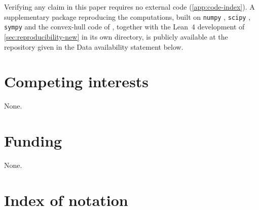 \documentclass[11pt,reqno]{amsart}
\newcommand{\bluelink}[2]{\href{#1}{\textcolor{blue}{#2}}}
\renewcommand{\_}{\origunderscore\allowbreak}
\numberwithin{equation}{section}
\theoremstyle{plain}
\theoremstyle{definition}
\theoremstyle{remark}
\begin{document}
Verifying any claim in this paper requires no external code
(\cref{app:code-index}). A supplementary package reproducing the
computations, built on \texttt{numpy} \cite{Har20}, \texttt{scipy}
\cite{Vir20}, \texttt{sympy} \cite{Meu17} and the convex-hull code of
\cite{BDH96}, together with the Lean~4 development of
\cref{sec:reproducibility-new} in its own directory, is publicly
available at the repository given in the Data availability statement
below.
%

\section*{Competing interests}

None.

\section*{Funding}

None.

\appendix
\section{Index of notation}\label{app:notation}
\end{document}
